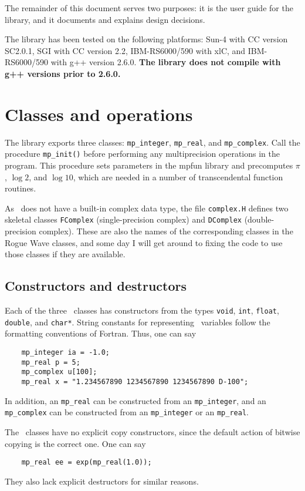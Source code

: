 The remainder of this document serves two purposes:
it is the user guide for the library,
and it documents and explains design decisions.

The library has been tested on the following platforms: 
Sun-4 with CC version SC2.0.1,
SGI with CC version 2.2,
IBM-RS6000/590 with xlC,
and IBM-RS6000/590 with g++ version 2.6.0.
{\bf The library does not compile with g++ versions prior to 2.6.0.}

\section{Classes and operations}

The library exports three classes: 
\verb|mp_integer|, \verb|mp_real|, and \verb|mp_complex|.
Call the procedure \verb|mp_init()| before performing any
multiprecision operations in the program.
This procedure sets parameters in the mpfun library and precomputes
$\pi$, $\log 2$, and $\log 10$,
which are needed in a number of transcendental function routines.

As \CC\ does not have a built-in complex data type,
the file \verb|complex.H| defines two skeletal classes \verb|FComplex|
(single-precision complex) and \verb|DComplex| (double-precision
complex).
These are also the names of the corresponding classes in the Rogue
Wave classes,
and some day I will get around to fixing the code to use those classes
if they are available.

\subsection{Constructors and destructors}

Each of the three \mp\ classes has constructors from the types
\verb|void|, \verb|int|, \verb|float|, \verb|double|, and
\verb|char*|.
String constants for representing \mp\ variables follow the
formatting conventions of Fortran.
Thus,
one can say
\begin{verbatim}
    mp_integer ia = -1.0;
    mp_real p = 5;
    mp_complex u[100];
    mp_real x = "1.234567890 1234567890 1234567890 D-100";
\end{verbatim}
In addition,
an \verb|mp_real| can be constructed from an \verb|mp_integer|,
and an \verb|mp_complex| can be constructed from an \verb|mp_integer|
or an \verb|mp_real|.

The \mp\ classes have no explicit copy constructors,
since the default action of bitwise copying is the correct one.
One can say
\begin{verbatim}
    mp_real ee = exp(mp_real(1.0));
\end{verbatim}
They also lack explicit destructors for similar reasons.

